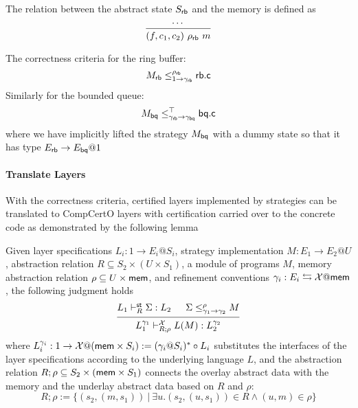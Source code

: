 \documentclass[sigplan,10pt,authordraft]{acmart}
\begin{document}
\begin{example}
  The relation between the abstract state $S_{ \mathsf{rb} }$ and the memory is defined
  as
  \[
    \begin{prooftree}
      \hypo{\cdots}
      \infer1{(f, c_1, c_2)\ \rho_\kw{rb}\ m}
    \end{prooftree}
  \]

  The correctness criteria for the ring buffer:
  \[
    M_{ \mathsf{rb} } \le^{\rho_{ \mathsf{rb} }}_{1 \rightarrow \gamma_{ \mathsf{rb} }}  \mathsf{rb.c} 
  \]
  Similarly for the bounded queue:
  \[
    M_{ \mathsf{bq} } \le^{\top}_{\gamma_{ \mathsf{rb} } \rightarrow \gamma_{ \mathsf{bq} }}  \mathsf{bq.c} 
  \]
  where we have implicitly lifted the strategy $M_{ \mathsf{bq} }$ with a dummy
  state so that it has type $E_{ \mathsf{rb} } \rightarrow E_{ \mathsf{bq} } @ 1$
\end{example}

\paragraph{Translate Layers} With the correctness criteria, certified layers
implemented by strategies can be translated to CompCertO layers with
certification carried over to the concrete code as demonstrated by the following
lemma

\begin{lemma}
  Given layer specifications $L_i: 1 \rightarrow E_i@S_i$, strategy
  implementation $M: E_1 \rightarrow E_2@U$, abstraction relation
  $R \subseteq S_2 \times (U\times S_1)$, a module of programs $M$, memory
  abstraction relation $\rho \subseteq U \times  \mathsf{mem} $, and refinement
  conventions $\gamma_i: E_i \leftrightarrows \mathcal{X}@ \mathsf{mem} $, the
  following judgment holds
  \[
    \begin{prooftree}
      \hypo{L_1 \vdash^\kw{st}_R \Sigma : L_2}
      \hypo{\Sigma \le^\rho_{\gamma_1 \rightarrow \gamma_2} M}
      \infer2{ L_1^{\gamma_1}
        \vdash^\mathcal{X}_{R;\rho} L(M):
        L_2^{\gamma_2}}
    \end{prooftree}
  \]
  where
  $L_i^{\gamma_i}: 1 \rightarrow \mathcal{X}@( \mathsf{mem} \times S_i) :=
  (\gamma_i@S_i)^* \circ L_i$ substitutes the interfaces of the layer
  specifications according to the underlying language $L$, and the abstraction
  relation $R;\rho \subseteq S_2 \times ( \mathsf{mem}  \times S_1)$ connects the
  overlay abstract data with the memory and the underlay abstract data based on
  $R$ and $\rho$:
  \[
    R;\rho := \{ (s_2, (m, s_1))\ |\ \exists u. (s_2, (u, s_1)) \in R \wedge (u, m) \in \rho\}
  \]
\end{lemma}
\end{document}
